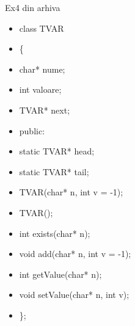 \documentclass[pdf]{beamer}
\begin{document}
\begin{frame}{Ex4 din arhiva}
\begin{itemize}
\item
class TVAR
\item \hspace{4mm}
\{
\item \qquad
char* nume;
\item \qquad
int valoare;
\item \qquad
TVAR* next;
\item \hspace{4mm} \vspace{5mm}
public:
\item \qquad
static TVAR* head;
\item \qquad \vspace{5mm}
static TVAR* tail;
\item \qquad 
TVAR(char* n, int v = -1);
\item \qquad
TVAR();
\item \qquad
int exists(char* n);
\item \qquad
void add(char* n, int v = -1);
\item \qquad
int getValue(char* n);
\item \qquad
void setValue(char* n, int v);
\item \hspace{4mm}
\};

\end{itemize}
\end{frame}
\end{document}
